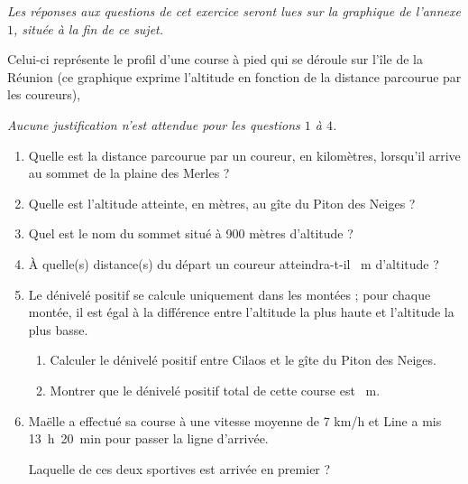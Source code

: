 
\medskip 

\emph{Les réponses aux questions de cet exercice seront lues sur la graphique de l’annexe $1$, située à la fin de ce sujet.}

\medskip 

Celui-ci représente le profil d'une course à pied qui se déroule sur l'île de la Réunion (ce graphique exprime l'altitude en fonction de la distance parcourue par les coureurs), 

\smallskip

\emph{Aucune justification n’est attendue pour les questions $1$ à $4$.}

\medskip 

\begin{enumerate}
\item Quelle est la distance parcourue par un coureur, en kilomètres, lorsqu'il arrive au sommet de la plaine des Merles ? 
\item Quelle est l’altitude atteinte, en mètres, au gîte du Piton des Neiges ?
\item Quel est le nom du sommet situé à 900 mètres d’altitude ? 
\item À quelle(s) distance(s) du départ un coureur atteindra-t-il ~m d’altitude ?
\item Le dénivelé positif se calcule uniquement dans les montées ; pour chaque montée, il est égal à la différence entre l’altitude la plus haute et l’altitude la plus basse.
	\begin{enumerate}
		\item Calculer le dénivelé positif entre Cilaos et le gîte du Piton des Neiges. 
		\item Montrer que le dénivelé positif total de cette course est ~m. 
	\end{enumerate}
\item  Maëlle a effectué sa course à une vitesse moyenne de 7 km/h et Line a mis 13~h~20~min pour passer la ligne d'arrivée. 

Laquelle de ces deux sportives est arrivée en premier ? 
\end{enumerate}

